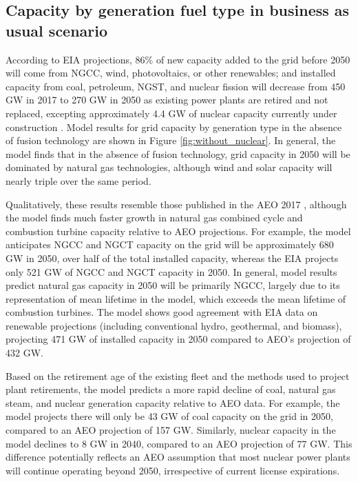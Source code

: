 \documentclass[review]{elsarticle}
\begin{document}
\subsection{Capacity by generation fuel type in business as usual scenario}


According to EIA projections, 86\% of new capacity added to the grid before 2050 will come from NGCC, wind, photovoltaics, or other renewables; and installed capacity from coal, petroleum, NGST, and nuclear fission will decrease from 450 GW in 2017 to 270 GW in 2050 as existing power plants are retired and not replaced, excepting approximately 4.4 GW of nuclear capacity currently under construction \citep{NEMS2014} . Model results for grid capacity by generation type in the absence of fusion technology are shown in Figure \ref{fig:without_nuclear}. In general, the model finds that in the absence of fusion technology, grid capacity in 2050 will be dominated by natural gas technologies, although wind and solar capacity will nearly triple over the same period.

Qualitatively, these results resemble those published in the AEO 2017 \citep{NEMS2014} , although the model finds much faster growth in natural gas combined cycle and combustion turbine capacity relative to AEO projections. For example, the model anticipates NGCC and NGCT capacity on the grid will be approximately 680 GW in 2050, over half of the total installed capacity, whereas the EIA projects only 521 GW of NGCC and NGCT capacity in 2050. In general, model results predict natural gas capacity in 2050 will be primarily NGCC, largely due to its representation of mean lifetime in the model, which exceeds the mean lifetime of combustion turbines. The model shows good agreement with EIA data on renewable projections (including conventional hydro, geothermal, and biomass), projecting 471 GW of installed capacity in 2050 compared to AEO's projection of 432 GW.

Based on the retirement age of the existing fleet and the methods used to project plant retirements, the model predicts a more rapid decline of coal, natural gas steam, and nuclear generation capacity relative to AEO data. For example, the model projects there will only be 43 GW of coal capacity on the grid in 2050, compared to an AEO projection of 157 GW. Similarly, nuclear capacity in the model declines to 8 GW in 2040, compared to an AEO projection of 77 GW. This difference potentially reflects an AEO assumption that most nuclear power plants will continue operating beyond 2050, irrespective of current license expirations.
\end{document}

